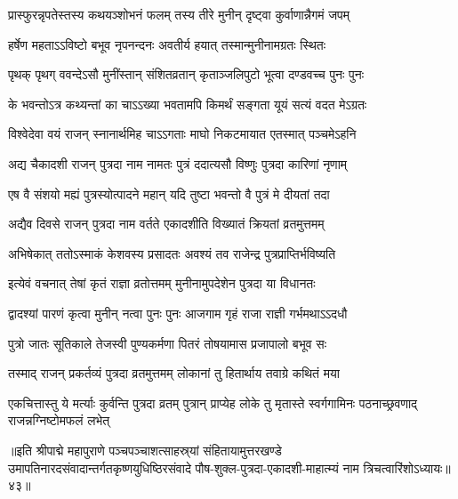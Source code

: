 \twolineshloka
{प्रास्फुरन्नृपतेस्तस्य कथयञ्शोभनं फलम्}
{तस्य तीरे मुनीन् दृष्ट्वा कुर्वाणान्नैगमं जपम्}%

\twolineshloka
{हर्षेण महताऽऽविष्टो बभूव नृपनन्दनः}
{अवतीर्य हयात् तस्मान्मुनीनामग्रतः स्थितः}%

\twolineshloka
{पृथक् पृथग् ववन्देऽसौ मुनींस्तान् संशितव्रतान्}
{कृताञ्जलिपुटो भूत्वा दण्डवच्च पुनः पुनः}%



\twolineshloka
{के भवन्तोऽत्र कथ्यन्तां का चाऽऽख्या भवतामपि}
{किमर्थं सङ्गता यूयं सत्यं वदत मेऽग्रतः}%


\twolineshloka
{विश्वेदेवा वयं राजन् स्नानार्थमिह चाऽऽगताः}
{माघो निकटमायात एतस्मात् पञ्चमेऽहनि}%

\twolineshloka
{अद्य चैकादशी राजन् पुत्रदा नाम नामतः}
{पुत्रं ददात्यसौ विष्णुः पुत्रदा कारिणां नृणाम्}%


\twolineshloka
{एष वै संशयो मह्यं पुत्रस्योत्पादने महान्}
{यदि तुष्टा भवन्तो वै पुत्रं मे दीयतां तदा}%


\twolineshloka
{अद्यैव दिवसे राजन् पुत्रदा नाम वर्तते}
{एकादशीति विख्यातं क्रियतां व्रतमुत्तमम्}%

\twolineshloka
{अभिषेकात् ततोऽस्माकं केशवस्य प्रसादतः}
{अवश्यं तव राजेन्द्र पुत्रप्राप्तिर्भविष्यति}%

\twolineshloka
{इत्येवं वचनात् तेषां कृतं राज्ञा व्रतोत्तमम्}
{मुनीनामुपदेशेन पुत्रदा या विधानतः}%

\twolineshloka
{द्वादश्यां पारणं कृत्वा मुनीन् नत्वा पुनः पुनः}
{आजगाम गृहं राजा राज्ञी गर्भमथाऽऽदधौ}%

\twolineshloka
{पुत्रो जातः सूतिकाले तेजस्वी पुण्यकर्मणा}
{पितरं तोषयामास प्रजापालो बभूव सः}%

\twolineshloka
{तस्माद् राजन् प्रकर्तव्यं पुत्रदा व्रतमुत्तमम्}
{लोकानां तु हितार्थाय तवाग्रे कथितं मया}%

\threelineshloka
{एकचित्तास्तु ये मर्त्याः कुर्वन्ति पुत्रदा व्रतम्}
{पुत्रान् प्राप्येह लोके तु मृतास्ते स्वर्गगामिनः}
{पठनाच्छ्रवणाद् राजन्नग्निष्टोमफलं लभेत्}%

॥इति श्रीपाद्मे महापुराणे पञ्चपञ्चाशत्साहस्र्यां संहितायामुत्तरखण्डे उमापतिनारदसंवादान्तर्गतकृष्णयुधिष्ठिरसंवादे पौष-शुक्ल-पुत्रदा-एकादशी-माहात्म्यं नाम त्रिचत्वारिंशोऽध्यायः॥४३॥

